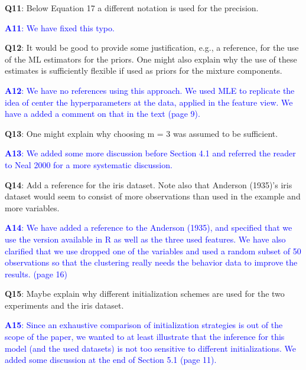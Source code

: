 \documentclass[]{article}
\begin{document}
	\vspace{3mm}
	\textbf{Q11}:  Below Equation 17 a different notation is used for the precision.

	\textcolor{blue}{  
	\textbf{A11}: We have fixed this typo.
	} 

	
	\vspace{3mm}
	\textbf{Q12}: It would be good to provide some justification, e.g., a reference, for the use of the ML estimators for the priors. One might also explain why the use of these estimates is sufficiently flexible if used as priors for the mixture components.

	\textcolor{blue}{  
	\textbf{A12}: We have no references using this approach.  We used MLE to replicate the idea of center the hyperparameters at the data, applied in the feature view.  We have a added a comment on that in the text (page 9).
	} 
	
	\vspace{3mm}
	\textbf{Q13}:  One might explain why choosing m = 3 was assumed to be sufficient.

	\textcolor{blue}{  
	\textbf{A13}: We added some more discussion before Section 4.1 and referred the reader to Neal 2000 for a more systematic discussion. 
	} 

	
	\vspace{3mm}
	\textbf{Q14}:  Add a reference for the iris dataset. Note also that Anderson (1935)'s iris dataset would seem to consist of more observations than used in the example and more variables.

	\textcolor{blue}{  
	\textbf{A14}: We have added a reference to the Anderson (1935), and specified that we use the version available in R as well as the three used features. We have also clarified that we use dropped one of the variables and used a random subset of 50 observations so that the clustering really needs the behavior data to improve the results.  (page 16)
	} 
	
	\vspace{3mm}
	\textbf{Q15}: Maybe explain why different initialization schemes are used for the two experiments and the iris dataset.

	\textcolor{blue}{  
	\textbf{A15}: Since an exhaustive comparison of initialization strategies is out of the scope of the paper, we wanted to at least illustrate that the inference for this model (and the used datasets) is not too sensitive to different initializations. We added some discussion at the end of Section 5.1 (page 11).
	} 
\end{document}
